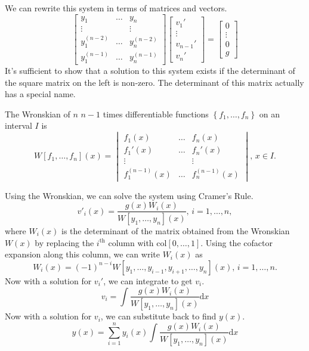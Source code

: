 \noindent
We can rewrite this system in terms of matrices and vectors.
\begin{equation*}
	\begin{bmatrix}
		y_1 & \ldots & y_n \\
		\vdots & & \vdots\\
		y_1^{(n-2)} & \ldots & y_n^{(n-2)} \\
		y_1^{(n-1)} & \ldots & y_n^{(n-1)}
	\end{bmatrix} \begin{bmatrix}
		v_1' \\
		\vdots \\
		v_{n-1}' \\
		v_n'
	\end{bmatrix} = \begin{bmatrix}
		0 \\
		\vdots \\
		0 \\
		g
	\end{bmatrix}
\end{equation*}
It's sufficient to show that a solution to this system exists if the determinant of the square matrix on the left is non-zero. The determinant of this matrix actually has a special name.

\begin{definition}
	The Wronskian of $n$ $n-1$ times differentiable functions $\left\{f_1, \ldots, f_n\right\}$ on an interval $I$ is
	\begin{equation*}
		W[f_1, \ldots, f_n](x) = \begin{vmatrix}
			f_1(x) & \ldots & f_n(x) \\
			f_1'(x) & \ldots & f_n'(x) \\
			\vdots &        & \vdots \\
			f_1^{(n-1)}(x) & \ldots & f_n^{(n-1)}(x)
		\end{vmatrix} \text{, } x \in I.
	\end{equation*}
\end{definition} 

\noindent
Using the Wronskian, we can solve the system using Cramer's Rule.
\begin{equation*}
	v'_i(x) = \frac{g(x)W_i(x)}{W[y_1, \ldots, y_n](x)} \text{, } i = 1, \ldots, n,
\end{equation*}
where $W_i(x)$ is the determinant of the matrix obtained from the Wronskian $W(x)$ by replacing the $i^{\text{th}}$ column with $\text{col}[0, \ldots, 1]$. Using the cofactor expansion along this column, we can write $W_i(x)$ as
\begin{equation*}
	W_i(x) = (-1)^{n-i}W[y_1, \ldots, y_{i-1}, y_{i+1}, \ldots, y_n](x) \text{, } i = 1, \ldots, n.
\end{equation*}
Now with a solution for $v_i'$, we can integrate to get $v_i$.
\begin{equation*}
	v_i = \int{\frac{g(x)W_i(x)}{W[y_1, \ldots, y_n](x)} \mathrm{d}x}
\end{equation*}
Now with a solution for $v_i$, we can substitute back to find $y(x)$.
\begin{equation*}
	y(x) = \sum_{i=1}^{n}{y_i(x)\int{\frac{g(x)W_i(x)}{W[y_1, \ldots, y_n](x)} \mathrm{d}x}}
\end{equation*}

